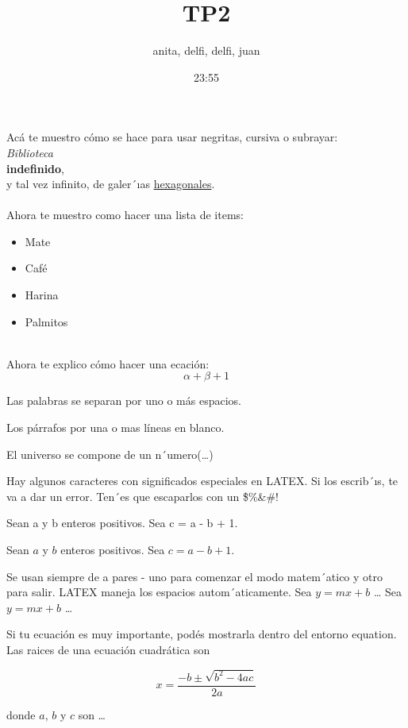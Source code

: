 \documentclass{article}
\title{TP2}
\author{anita, delfi, delfi, juan}
\date{23:55}
\begin{document}
\maketitle


Acá te muestro cómo se hace para usar negritas, cursiva o subrayar: \\

\emph{Biblioteca} \\ \textbf{indefinido}, \\
y tal vez infinito, de galer´ıas \underline{hexagonales}.\\
\\ Ahora te muestro como hacer una lista de items:\\
\begin{itemize}
\item Mate
\item Café
\item Harina
\item Palmitos
\end{itemize}\\ Ahora te explico cómo hacer una ecación:
\begin{equation}
\alpha + \beta + 1
\end{equation} 

Las palabras se separan
por uno o más espacios.


Los párrafos por una o
mas líneas en blanco.


El universo se compone
de un n´umero(\ldots)


Hay algunos caracteres con significados especiales en LATEX. Si los escrib´ıs, te
va a dar un error. Ten´es que escaparlos con un \.
\$\%\&\#!

Sean a y b enteros positivos.
Sea c = a - b + 1.

Sean $a$ y $b$ enteros positivos.
Sea $c = a - b + 1$.

Se usan siempre de a pares - uno para comenzar el modo matem´atico y otro
para salir. LATEX maneja los espacios autom´aticamente.
Sea $y=mx+b$ \ldots
Sea $y = m x + b$ \ldots


Si tu ecuación es muy importante, podés mostrarla dentro del entorno
equation.
Las raices de una ecuación cuadrática son

\begin{equation}
x = \frac{-b \pm \sqrt{b^2 - 4ac}}
{2a}
\end{equation}

donde $a$, $b$ y $c$ son \ldots
\end{document}
